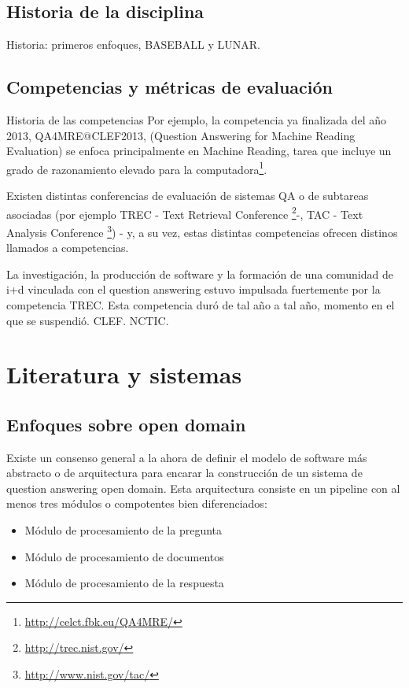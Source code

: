 \subsection{Historia de la disciplina}
\label{subsec:historia}
{\color{red}Historia: primeros enfoques, BASEBALL y LUNAR.}

\subsection{Competencias y métricas de evaluación}
\label{subsec:competencias}
{\color{red}Historia de las competencias}
Por ejemplo, la competencia ya finalizada del año 2013, QA4MRE@CLEF2013, (Question Answering for Machine Reading Evaluation) se enfoca principalmente en Machine Reading, tarea que incluye un grado de razonamiento elevado para la computadora\footnote{\url{http://celct.fbk.eu/QA4MRE/}}.

Existen distintas conferencias de evaluación de sistemas QA o de subtareas asociadas (por ejemplo TREC - Text Retrieval Conference \footnote{\url{http://trec.nist.gov/}}-, TAC - Text Analysis Conference \footnote{\url{http://www.nist.gov/tac/}}) - y, a su vez, estas distintas competencias ofrecen distinos llamados a competencias.

La investigación, la producción de software y la formación de una comunidad de i+d vinculada con el question answering estuvo impulsada fuertemente por la competencia TREC. Esta competencia duró de tal año a tal año, momento en el que se suspendió. CLEF. NCTIC. 

\section{Literatura y sistemas}
\label{sec:literatura}
\subsection{Enfoques sobre open domain}
\label{subsec:open-domain}

Existe un consenso general a la ahora de definir el modelo de software más abstracto o de arquitectura para encarar la construcción de un sistema de question answering open domain. Esta arquitectura consiste en un pipeline con al menos tres módulos o compotentes bien diferenciados:
\begin{itemize}
\item Módulo de procesamiento de la pregunta
\item Módulo de procesamiento de documentos
\item Módulo de procesamiento de la respuesta
\end{itemize}

